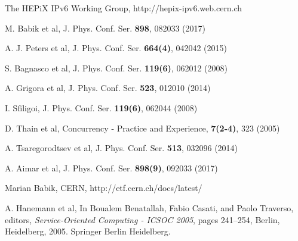 \begin{thebibliography}{}
%
%


 The HEPiX IPv6 Working Group, http://hepix-ipv6.web.cern.ch

M. Babik et al, J. Phys. Conf. Ser. {\bf898}, 082033 (2017)


 A. J. Peters et al, J. Phys. Conf. Ser. {\bf664(4)}, 042042 (2015)



S. Bagnasco et al, J. Phys. Conf. Ser. {\bf119(6)}, 062012 (2008)

A. Grigora et al, J. Phys. Conf. Ser. {\bf523}, 012010 (2014)

I. Sfiligoi, J. Phys. Conf. Ser. {\bf119(6)}, 062044 (2008)

D. Thain et al, Concurrency - Practice and Experience, {\bf 7(2-4)}, 323 (2005)

 A. Tsaregorodtsev et al, J. Phys. Conf. Ser. {\bf513}, 032096 (2014)



A. Aimar et al, J. Phys. Conf. Ser. {\bf 898(9)}, 092033 (2017)


Marian Babik, CERN,
http://etf.cern.ch/docs/latest/

A. Hanemann et al, 
\newblock In Boualem Benatallah, Fabio Casati, and Paolo Traverso, editors,
  {\em Service-Oriented Computing - ICSOC 2005}, pages 241--254, Berlin, Heidelberg, 2005. Springer Berlin Heidelberg.


\end{thebibliography}
